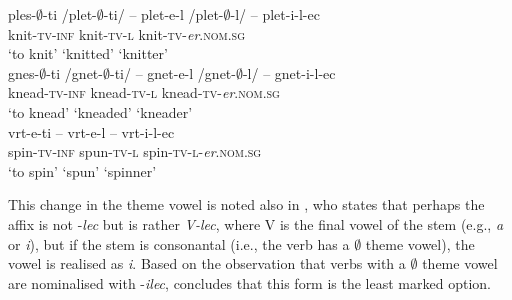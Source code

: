 \documentclass[output=paper,colorlinks,citecolor=brown]{langscibook}
\begin{document}
\ex \label{ex:tvchange1a}
 \glll ples-$\emptyset$-ti{ }/plet-$\emptyset$-ti/ -- plet-e-l{ }/plet-$\emptyset$-l/ -- plet-i-l-ec   \\
   knit-\textsc{tv}-\textsc{inf} {} knit-\textsc{tv}-\textsc{l} {} knit-\textsc{tv}-\textit{er}.\textsc{nom.sg} \\
   `to{ }knit' {} `knitted' {} `knitter' \\
 
 \ex \glll gnes-$\emptyset$-ti{ }/gnet-$\emptyset$-ti/ -- gnet-e-l{ }/gnet-$\emptyset$-l/ -- gnet-i-l-ec \\
 knead-\textsc{tv}-\textsc{inf} {}  knead-\textsc{tv}-\textsc{l} {} knead-\textsc{tv}-\textit{er}.\textsc{nom.sg}\\
`to{ }knead' {}  `kneaded' {} `kneader'\\

  \ex \glll vrt-e-ti -- vrt-e-l -- vrt-i-l-ec\\ 
  spin-\textsc{tv}-\textsc{inf} {} spun-\textsc{tv}-\textsc{l} {}  spin-\textsc{tv}-\textsc{l}-\textit{er}.\textsc{nom.sg}\\
  `to{ }spin' {} `spun' {} `spinner'\\
  \z \z 

\noindent This change in the theme vowel is noted also in \citet[163--164]{sim+:toporisic2000}, who states that perhaps the affix is not -\textit{lec} but is rather \textit{V-lec}, where V is the final vowel of the stem (e.g., \textit{a} or \textit{i}), but if the stem is consonantal (i.e., the verb has a $\emptyset$ theme vowel), the vowel is realised as \textit{i}. Based on the observation that verbs with a \textit{$\emptyset$} theme vowel are nominalised with -\textit{ilec}, \citet[]{stramljic1999} concludes that this form is the least marked option. 
\end{document}
